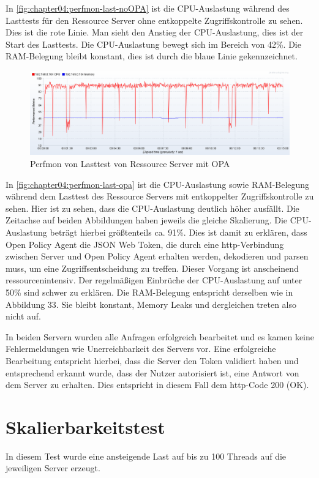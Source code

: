 In \autoref{fig:chapter04:perfmon-last-noOPA} ist die CPU-Auslastung während des Lasttests für den Ressource Server ohne entkoppelte Zugriffskontrolle zu sehen. Dies ist die rote Linie. Man sieht den Anstieg der CPU-Auslastung, dies ist der Start des Lasttests. Die CPU-Auslastung bewegt sich im Bereich von 42\%. Die RAM-Belegung bleibt konstant, dies ist durch die blaue Linie gekennzeichnet. 

\begin{figure}[htbp]
  \centering
  \includegraphics[width=1.0\textwidth]{gfx/perfmon-last-opa.png}
  \caption{Perfmon von Lasttest von Ressource Server mit OPA}
  \label{fig:chapter04:perfmon-last-opa}
\end{figure}

In \autoref{fig:chapter04:perfmon-last-opa} ist die CPU-Auslastung sowie RAM-Belegung während dem Lasttest des Ressource Servers mit entkoppelter Zugriffskontrolle zu sehen. Hier ist zu sehen, dass die CPU-Auslastung deutlich höher ausfällt. Die Zeitachse auf beiden Abbildungen haben jeweils die gleiche Skalierung. Die CPU-Auslastung beträgt hierbei größtenteils ca. 91\%. Dies ist damit zu erklären, dass Open Policy Agent die JSON Web Token, die durch eine http-Verbindung zwischen Server und Open Policy Agent erhalten werden, dekodieren und parsen muss, um eine Zugriffsentscheidung zu treffen. Dieser Vorgang ist anscheinend ressourcenintensiv. Der regelmäßigen Einbrüche der CPU-Auslastung auf unter 50\% sind schwer zu erklären. Die RAM-Belegung entspricht derselben wie in Abbildung 33. Sie bleibt konstant, Memory Leaks und dergleichen treten also nicht auf.\smallskip

In beiden Servern wurden alle Anfragen erfolgreich bearbeitet und es kamen keine Fehlermeldungen wie Unerreichbarkeit des Servers vor. Eine erfolgreiche Bearbeitung entspricht hierbei, dass die Server den Token validiert haben und entsprechend erkannt wurde, dass der Nutzer autorisiert ist, eine Antwort von dem Server zu erhalten. Dies entspricht in diesem Fall dem http-Code 200 (OK). 

\section{Skalierbarkeitstest}
In diesem Test wurde eine ansteigende Last auf bis zu 100 Threads auf die jeweiligen Server erzeugt. 

